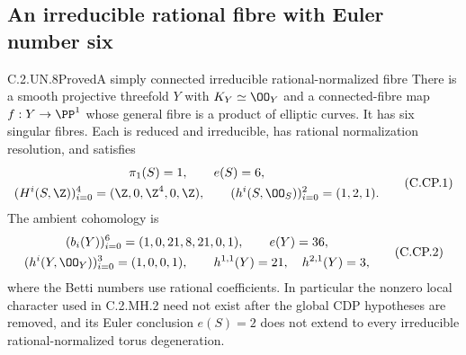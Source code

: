 \subsection{An irreducible rational fibre with Euler number six}

\begin{statement}{C.2.UN.8}{Proved}{A simply connected irreducible rational-normalized fibre}
There is a smooth projective threefold $Y$ with $K_Y\simeq\OO_Y$
and a connected-fibre map $f:Y\to\PP^1$ whose general fibre is a
product of elliptic curves. It has six singular fibres. Each is
reduced and irreducible, has rational normalization resolution, and
satisfies
\[
 \begin{gathered}
 \pi_1(S)=1,\qquad e(S)=6,\\
 (H^i(S,\Z))_{i=0}^4=(\Z,0,\Z^4,0,\Z),\qquad
 (h^i(S,\OO_S))_{i=0}^2=(1,2,1).
 \end{gathered}
 \tag{C.CP.1}
\]
The ambient cohomology is
\[
 \begin{gathered}
 (b_i(Y))_{i=0}^6=(1,0,21,8,21,0,1),\qquad e(Y)=36,\\
 (h^i(Y,\OO_Y))_{i=0}^3=(1,0,0,1),\qquad
 h^{1,1}(Y)=21,\quad h^{2,1}(Y)=3,
 \end{gathered}
 \tag{C.CP.2}
\]
where the Betti numbers use rational coefficients. In particular
the nonzero local character used in C.2.MH.2 need not exist after
the global CDP hypotheses are removed, and its Euler conclusion
$e(S)=2$ does not extend to every irreducible rational-normalized
torus degeneration.
\end{statement}
